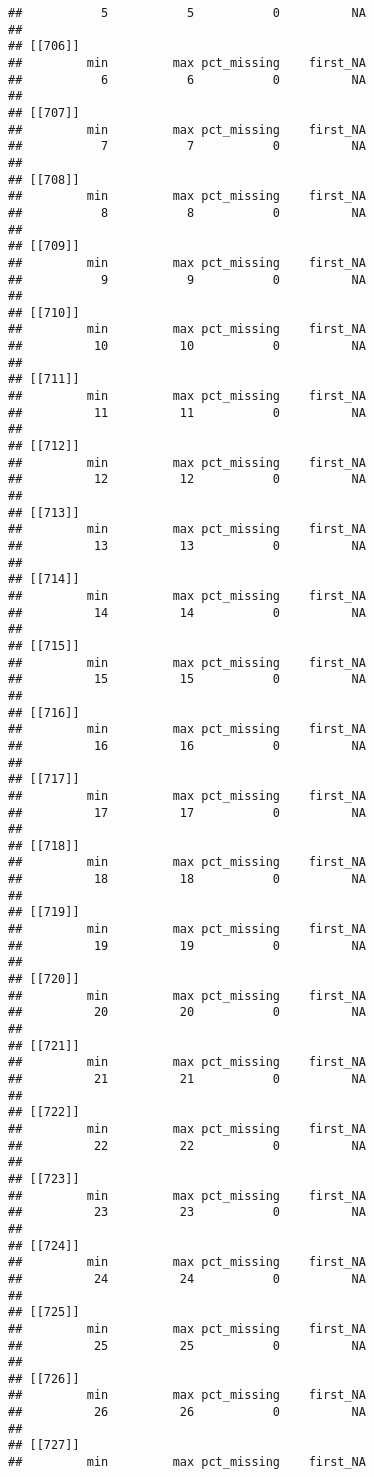 \documentclass[
]{article}
\begin{document}
\begin{verbatim}
##           5           5           0          NA 
## 
## [[706]]
##         min         max pct_missing    first_NA 
##           6           6           0          NA 
## 
## [[707]]
##         min         max pct_missing    first_NA 
##           7           7           0          NA 
## 
## [[708]]
##         min         max pct_missing    first_NA 
##           8           8           0          NA 
## 
## [[709]]
##         min         max pct_missing    first_NA 
##           9           9           0          NA 
## 
## [[710]]
##         min         max pct_missing    first_NA 
##          10          10           0          NA 
## 
## [[711]]
##         min         max pct_missing    first_NA 
##          11          11           0          NA 
## 
## [[712]]
##         min         max pct_missing    first_NA 
##          12          12           0          NA 
## 
## [[713]]
##         min         max pct_missing    first_NA 
##          13          13           0          NA 
## 
## [[714]]
##         min         max pct_missing    first_NA 
##          14          14           0          NA 
## 
## [[715]]
##         min         max pct_missing    first_NA 
##          15          15           0          NA 
## 
## [[716]]
##         min         max pct_missing    first_NA 
##          16          16           0          NA 
## 
## [[717]]
##         min         max pct_missing    first_NA 
##          17          17           0          NA 
## 
## [[718]]
##         min         max pct_missing    first_NA 
##          18          18           0          NA 
## 
## [[719]]
##         min         max pct_missing    first_NA 
##          19          19           0          NA 
## 
## [[720]]
##         min         max pct_missing    first_NA 
##          20          20           0          NA 
## 
## [[721]]
##         min         max pct_missing    first_NA 
##          21          21           0          NA 
## 
## [[722]]
##         min         max pct_missing    first_NA 
##          22          22           0          NA 
## 
## [[723]]
##         min         max pct_missing    first_NA 
##          23          23           0          NA 
## 
## [[724]]
##         min         max pct_missing    first_NA 
##          24          24           0          NA 
## 
## [[725]]
##         min         max pct_missing    first_NA 
##          25          25           0          NA 
## 
## [[726]]
##         min         max pct_missing    first_NA 
##          26          26           0          NA 
## 
## [[727]]
##         min         max pct_missing    first_NA 

\end{verbatim}
\end{document}
